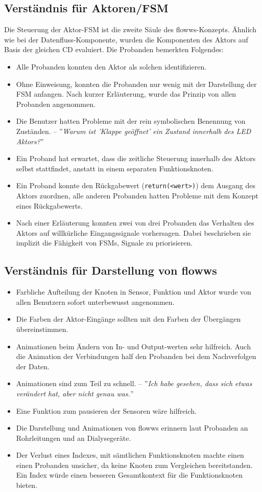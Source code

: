 \subsection*{Verständnis für Aktoren/\ac{FSM}} 
Die Steuerung der Aktor-\ac{FSM} ist die zweite Säule des flowws-Konzepts. Ähnlich wie bei der Datenfluss-Komponente, wurden die Komponenten des Aktors auf Basis der gleichen \ac{CD} evaluiert. Die Probanden bemerkten Folgendes:
\begin{itemize}
    \item Alle Probanden konnten den Aktor als solchen identifizieren.
    \item Ohne Einweisung, konnten die Probanden nur wenig mit der Darstellung der \ac{FSM} anfangen. Nach kurzer Erläuterung, wurde das Prinzip von allen Probanden angenommen.
    \item Die Benutzer hatten Probleme mit der rein symbolischen Benennung von Zuständen. -- ''\textit{Warum ist 'Klappe geöffnet' ein Zustand innerhalb des LED Aktors?}'' 
    \item Ein Proband hat erwartet, dass die zeitliche Steuerung innerhalb des Aktors selbst stattfindet, anstatt in einem separaten Funktionsknoten.
    \item Ein Proband konnte den Rückgabewert (\texttt{return(<wert>)}) dem Ausgang des Aktors zuordnen, alle anderen Probanden hatten Probleme mit dem Konzept eines Rückgabewerts.
    \item Nach einer Erläuterung konnten zwei von drei Probanden das Verhalten des Aktors auf willkürliche Eingangssignale vorhersagen. Dabei beschrieben sie implizit die Fähigkeit von \acp{FSM}, Signale zu priorisieren.
\end{itemize}

\subsection*{Verständnis für Darstellung von flowws}
\begin{itemize}
    \item Farbliche Aufteilung der Knoten in Sensor, Funktion und Aktor wurde von allen Benutzern sofort unterbewusst angenommen.
    \item Die Farben der Aktor-Eingänge sollten mit den Farben der Übergängen übereinstimmen.
    \item Animationen beim Ändern von In- und Output-werten sehr hilfreich. Auch die Animation der Verbindungen half den Probanden bei dem Nachverfolgen der Daten.
    \item Animationen sind zum Teil zu schnell. -- ''\textit{Ich habe gesehen, dass sich etwas verändert hat, aber nicht genau was.}''
    \item Eine Funktion zum pausieren der Sensoren wäre hilfreich.
    \item Die Darstellung und Animationen von flowws erinnern laut Probanden an Rohrleitungen und an Dia\-lyse\-ge\-räte.    
    \item Der Verlust eines Indexes, mit sämtlichen Funktionsknoten machte einen einen Probanden unsicher, da keine Knoten zum Vergleichen bereitstanden. Ein Index würde einen besseren Gesamtkontext für die Funktionsknoten bieten. 
\end{itemize}
